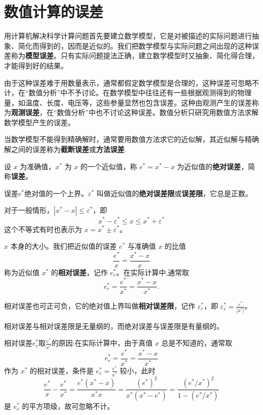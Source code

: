 \documentclass[../../main.tex]{subfiles}%
\begin{document}
\section{数值计算的误差}

用计算机解决科学计算问题首先要建立数学模型，它是对被描述的实际问题进行抽象、简化而得到的，因而是近似的。我们把数学模型与实际问题之间出现的这种误差称为\textbf{模型误差}。只有实际问题提法正确，建立数学模型时又抽象、简化得合理，才能得到好的结果。

由于这种误差难于用数量表示，通常都假定数学模型是合理的，这种误差可忽略不计，在“数值分析”中不予讨论。在数学模型中往往还有一些根据观测得到的物理量，如温度、长度、电压等，这些参量显然也包含误差。这种由观测产生的误差称为\textbf{观测误差}，在“数值分析”中也不讨论这种误差。数值分析只研究用数值方法求解数学模型产生的误差。

当数学模型不能得到精确解时，通常要用数值方法求它的近似解，其近似解与精确解之间的误差称为\textbf{截断误差}或\textbf{方法误差}.

\begin{definition}[误差和误差限]
设 $x$ 为准确值，$x^*$ 为 $x$ 的一个近似值，称 $e^* = x^* - x$ 为近似值的\textbf{绝对误差}，简称\textbf{误差}。

误差$e^*$绝对值的一个上界。$\varepsilon^*$ 叫做近似值的\textbf{绝对误差限}或\textbf{误差限}，它总是正数。

对于一般情形，$|x^* - x| \leqslant \varepsilon^*$，即 
\[
x^* - \varepsilon^* \leqslant x \leqslant x^* + \varepsilon^*
\]
这个不等式有时也表示为 $x = x^* \pm \varepsilon^*$。
\end{definition}

\begin{definition}[相对误差和相对误差限]
$x$ 本身的大小。我们把近似值的误差 $e^*$ 与准确值 $x$ 的比值 
\[
\frac{e^*}{x} = \frac{x^* - x}{x}
\]
称为近似值 $x^*$ 的\textbf{相对误差}，记作 $e_r^*$。在实际计算中,通常取 
\[
e_r^* = \frac{e^*}{x^*} = \frac{x^* - x}{x^*}.
\]

相对误差也可正可负，它的绝对值上界叫做\textbf{相对误差限}，记作 $\varepsilon_r^*$，即 $\varepsilon_r^* = \frac{\varepsilon^*}{|x^*|}$。
\end{definition}
\begin{remark}
相对误差与相对误差限是无量纲的，而绝对误差与误差限是有量纲的。
\end{remark}
\begin{remark}
相对误差$e_r^*$取$\frac{e^*}{x^*}$的原因:在实际计算中，由于真值 $x$ 总是不知道的，通常取 
\[
e_r^* = \frac{e^*}{x^*} = \frac{x^* - x}{x^*}
\]
作为 $x^*$ 的相对误差，条件是 $e_r^* = \frac{e^*}{x^*}$ 较小，此时 
\[
\frac{e^*}{x} - \frac{e^*}{x^*} = \frac{e^* (x^* - x)}{x^* x} = \frac{(e^*)^2}{x^* (x^* - e^*)} = \frac{(e^*/x^*)^2}{1 - (e^*/x^*)}
\]
是 $e_r^*$ 的平方项级，故可忽略不计。
\end{remark}
\end{document}
